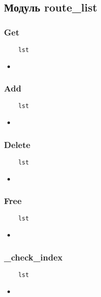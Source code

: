 \subsection{Модуль route\_list}

\subsubsection{Get}

\begin{lstlisting}
    lst
\end{lstlisting}

\begin{itemize}
    \item \verb||
\end{itemize}

\subsubsection{Add}

\begin{lstlisting}
    lst
\end{lstlisting}

\begin{itemize}
    \item \verb||
\end{itemize}

\subsubsection{Delete}

\begin{lstlisting}
    lst
\end{lstlisting}

\begin{itemize}
    \item \verb||
\end{itemize}

\subsubsection{Free}

\begin{lstlisting}
    lst
\end{lstlisting}

\begin{itemize}
    \item \verb||
\end{itemize}

\subsubsection{\_check\_index}

\begin{lstlisting}
    lst
\end{lstlisting}

\begin{itemize}
    \item \verb||
\end{itemize}

